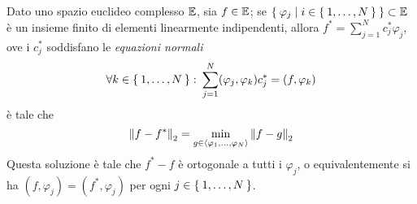 	\begin{teorema}\label{th:proiez-ortog}
		Dato uno spazio euclideo complesso \(\mathbb{E}\), sia \(f \in \mathbb{E}\); se \(\Set{\varphi_j | i \in \Set{1, \dots, N}} \subset \mathbb{E}\) è un insieme finito di elementi linearmente indipendenti, allora \(f^* = \sum_{j = 1}^N c_j^* \varphi_j\), ove i \(c_j^* \!\) soddisfano le \emph{equazioni normali}
		\begin{equation}\label{eq:eq-normali}
			\forall k \in \Set{1, \dots, N} \colon \sum_{j = 1}^N (\varphi_j, \varphi_k) c_j^* = (f, \varphi_k)
		\end{equation}
		è tale che\label{eq:proiez-ortog}
		\begin{equation}
			\norm{f - f^*}_2 = \min_{g \in \Braket{\varphi_1, \dots, \varphi_N}} \norm{f - g}_2
		\end{equation}
		Questa soluzione è tale che \(f^* - f\) è ortogonale a tutti i \(\varphi_j\), o equivalentemente si ha \((f, \varphi_j) = (f^*, \varphi_j)\) per ogni \(j \in \Set{1, \dots, N}\).
	\end{teorema}

